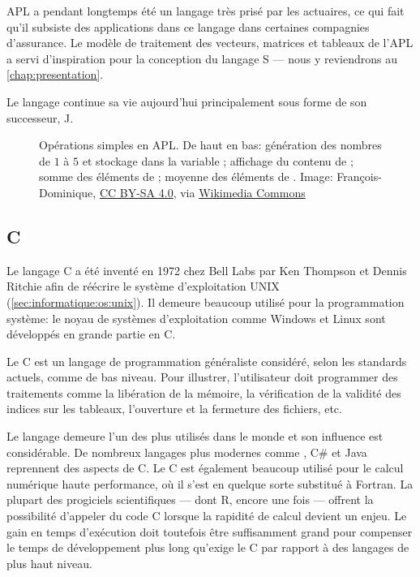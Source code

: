 APL a pendant longtemps été un langage très prisé par les actuaires,
ce qui fait qu'il subsiste des applications dans ce langage dans
certaines compagnies d'assurance. Le modèle de traitement des
vecteurs, matrices et tableaux de l'APL a servi d'inspiration pour la
conception du langage S --- nous y reviendrons au
\autoref{chap:presentation}.

Le langage continue sa vie aujourd'hui principalement sous forme de son
successeur, J.

\begin{figure}
  \centering
  \caption[Opérations simples en APL]{Opérations simples en APL. De
    haut en bas: génération des nombres de $1$ à $5$ et stockage dans
    la variable ; affichage du contenu de ; somme des
    éléments de ; moyenne des éléments de . {\small
      Image: {\textcopyright} François-Dominique,
      \href{https://creativecommons.org/licenses/by-sa/4.0/deed.fr}{CC
        BY-SA 4.0}, via
      \href{https://commons.wikimedia.org/w/index.php?curid=43207460}{Wikimedia
        Commons}}}
  \label{fig:informatique:apl}
\end{figure}

\subsection{C}
\label{sec:informatique:historique:c}

Le langage C a été inventé en 1972 chez Bell Labs par Ken
Thompson et Dennis Ritchie afin de réécrire le système d'exploitation
UNIX (\autoref{sec:informatique:os:unix}). Il demeure beaucoup utilisé
pour la programmation système: le noyau de systèmes d'exploitation
comme Windows et Linux sont développés en
grande partie en C.

Le C est un langage de programmation généraliste considéré, selon les
standards actuels, comme de bas niveau. Pour illustrer, l'utilisateur
doit programmer des traitements comme la libération de la mémoire, la
vérification de la validité des indices sur les tableaux, l'ouverture
et la fermeture des fichiers, etc.

Le langage demeure l'un des plus utilisés dans le monde et son
influence est considérable. De nombreux langages plus modernes comme
\Cpp, C\# et Java reprennent
des aspects de C. Le C est également beaucoup utilisé pour le calcul
numérique haute performance, où il s'est en quelque sorte substitué à
Fortran. La plupart des progiciels scientifiques --- dont R, encore
une fois --- offrent la possibilité d'appeler du code C lorsque la
rapidité de calcul devient un enjeu. Le gain en temps d'exécution doit
toutefois être suffisamment grand pour compenser le temps de
développement plus long qu'exige le C par rapport à des langages de
plus haut niveau.

